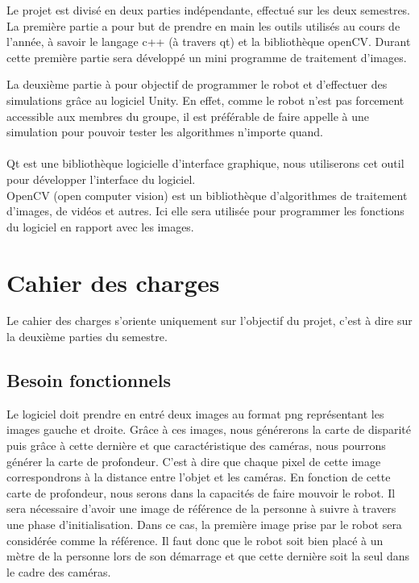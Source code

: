 \documentclass[12pt,a4paper]{report}
\begin{document}
Le projet est divisé en deux parties indépendante, effectué sur les deux semestres. 
La première partie a pour but de prendre en main les outils utilisés au cours de l'année, à savoir le langage c++ (à travers qt) et la bibliothèque openCV.
Durant cette première partie sera développé un mini programme de traitement d'images. 

La deuxième partie à pour objectif de programmer le robot et d'effectuer des simulations grâce au logiciel Unity. En effet, comme le robot n'est pas forcement accessible aux membres du groupe, il est préférable de faire appelle à une simulation pour pouvoir tester les algorithmes n'importe quand.\\\\

Qt est une bibliothèque logicielle d'interface graphique, nous utiliserons cet outil pour développer l'interface du logiciel.\\

OpenCV (open computer vision) est un bibliothèque d'algorithmes de traitement d'images, de vidéos et autres. Ici elle sera utilisée pour programmer les fonctions du logiciel en rapport avec les images.\\


\section{Cahier des charges}
Le cahier des charges s'oriente uniquement sur l'objectif du projet, c'est à dire sur la deuxième parties du semestre.
\subsection{Besoin fonctionnels}
	Le logiciel doit prendre en entré deux images au format png représentant les images gauche et droite.
	Grâce à ces images, nous générerons la carte de disparité puis grâce à cette dernière et que caractéristique des caméras, nous pourrons générer la carte de profondeur. C'est à dire que chaque pixel de cette image correspondrons à la distance entre l'objet et les caméras.
	En fonction de cette carte de profondeur, nous serons dans la capacités de faire mouvoir le robot.
	Il sera nécessaire d'avoir une image de référence de la personne à suivre à travers une phase d'initialisation. Dans ce cas, la première image prise par le robot sera considérée comme la référence. Il faut donc que le robot soit bien placé à un mètre de la personne lors de son démarrage et que cette dernière soit la seul dans le cadre des caméras.
\end{document}
